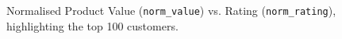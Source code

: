 \documentclass[11pt]{report}
\begin{document}
\begin{figure}[h]
	\centering
	\noindent{}
  	\caption{Normalised Product Value (\texttt{norm\_value}) vs. Rating (\texttt{norm\_rating}), highlighting the top 100 customers.}
  	\label{fig:rankings}
\end{figure}
\end{document}
